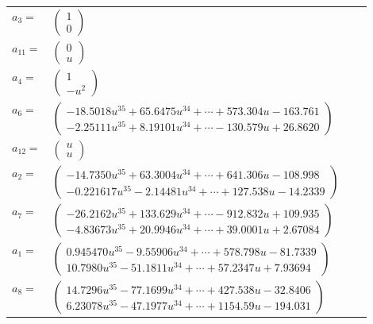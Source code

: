 \documentclass[1p]{elsarticle_modified}
\theoremstyle{definition}
\begin{document}
\begin{tabular}{m{7pt} m{180pt} m{7pt} m{180pt} }
\flushright $a_{3}=$&$\begin{pmatrix}1\\0\end{pmatrix}$ \\
\flushright $a_{11}=$&$\begin{pmatrix}0\\u\end{pmatrix}$ \\
\flushright $a_{4}=$&$\begin{pmatrix}1\\- u^2\end{pmatrix}$ \\
\flushright $a_{6}=$&$\begin{pmatrix}-18.5018 u^{35}+65.6475 u^{34}+\cdots+573.304 u-163.761\\-2.25111 u^{35}+8.19101 u^{34}+\cdots-130.579 u+26.8620\end{pmatrix}$ \\
\flushright $a_{12}=$&$\begin{pmatrix}u\\u\end{pmatrix}$ \\
\flushright $a_{2}=$&$\begin{pmatrix}-14.7350 u^{35}+63.3004 u^{34}+\cdots+641.306 u-108.998\\-0.221617 u^{35}-2.14481 u^{34}+\cdots+127.538 u-14.2339\end{pmatrix}$ \\
\flushright $a_{7}=$&$\begin{pmatrix}-26.2162 u^{35}+133.629 u^{34}+\cdots-912.832 u+109.935\\-4.83673 u^{35}+20.9946 u^{34}+\cdots+39.0001 u+2.67084\end{pmatrix}$ \\
\flushright $a_{1}=$&$\begin{pmatrix}0.945470 u^{35}-9.55906 u^{34}+\cdots+578.798 u-81.7339\\10.7980 u^{35}-51.1811 u^{34}+\cdots+57.2347 u+7.93694\end{pmatrix}$ \\
\flushright $a_{8}=$&$\begin{pmatrix}14.7296 u^{35}-77.1699 u^{34}+\cdots+427.538 u-32.8406\\6.23078 u^{35}-47.1977 u^{34}+\cdots+1154.59 u-194.031\end{pmatrix}$ \\

\end{tabular}
\end{document}
